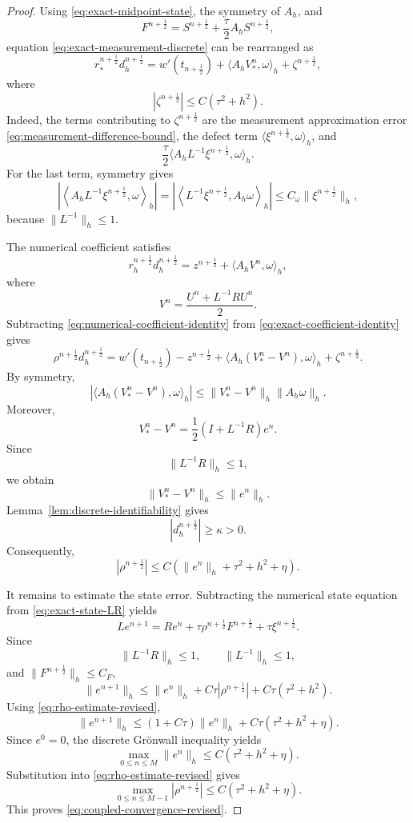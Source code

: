 \documentclass[10pt,a4paper]{amsart}
\begin{document}
\begin{proof}
Using \eqref{eq:exact-midpoint-state},
the symmetry of \(A_h\), and
\[
F^{n+\frac12}
=
S^{n+\frac12}
+
\frac{\tau}{2}A_hS^{n+\frac12},
\]
equation \eqref{eq:exact-measurement-discrete} can be rearranged as
\begin{equation}
r_*^{n+\frac12}
d_h^{n+\frac12}
=
w'(t_{n+\frac12})
+
\langle A_hV_*^n,\omega\rangle_h
+
\zeta^{n+\frac12},
\label{eq:exact-coefficient-identity}
\end{equation}
where
\begin{equation}
|\zeta^{n+\frac12}|
\le
C(\tau^2+h^2).
\label{eq:zeta-bound}
\end{equation}
Indeed, the terms contributing to \(\zeta^{n+\frac12}\) are
the measurement approximation error
\eqref{eq:measurement-difference-bound},
the defect term
\(\langle\xi^{n+\frac12},\omega\rangle_h\),
and
\[
\frac{\tau}{2}
\langle
A_hL^{-1}\xi^{n+\frac12},
\omega
\rangle_h.
\]
For the last term, symmetry gives
\[
\left|
\left\langle
A_hL^{-1}\xi^{n+\frac12},
\omega
\right\rangle_h
\right|
=
\left|
\left\langle
L^{-1}\xi^{n+\frac12},
A_h\omega
\right\rangle_h
\right|
\le
C_\omega
\|\xi^{n+\frac12}\|_h,
\]
because \(\|L^{-1}\|_h\le1\).

The numerical coefficient satisfies
\begin{equation}
r_h^{n+\frac12}
d_h^{n+\frac12}
=
z^{n+\frac12}
+
\langle A_hV^n,\omega\rangle_h,
\label{eq:numerical-coefficient-identity}
\end{equation}
where
\[
V^n
=
\frac{U^n+L^{-1}RU^n}{2}.
\]
Subtracting
\eqref{eq:numerical-coefficient-identity}
from \eqref{eq:exact-coefficient-identity} gives
\[
\rho^{n+\frac12}d_h^{n+\frac12}
=
w'(t_{n+\frac12})-z^{n+\frac12}
+
\langle A_h(V_*^n-V^n),\omega\rangle_h
+
\zeta^{n+\frac12}.
\]
By symmetry,
\[
\left|
\langle A_h(V_*^n-V^n),\omega\rangle_h
\right|
\le
\|V_*^n-V^n\|_h
\|A_h\omega\|_h.
\]
Moreover,
\[
V_*^n-V^n
=
\frac12
\left(
I+L^{-1}R
\right)e^n.
\]
Since
\[
\|L^{-1}R\|_h\le1,
\]
we obtain
\[
\|V_*^n-V^n\|_h
\le
\|e^n\|_h.
\]
Lemma~\ref{lem:discrete-identifiability} gives
\[
|d_h^{n+\frac12}|
\ge\kappa>0.
\]
Consequently,
\begin{equation}
|\rho^{n+\frac12}|
\le
C\left(
\|e^n\|_h
+
\tau^2+h^2+\eta
\right).
\label{eq:rho-estimate-revised}
\end{equation}

It remains to estimate the state error. Subtracting the numerical
state equation from \eqref{eq:exact-state-LR} yields
\[
Le^{n+1}
=
Re^n
+
\tau\rho^{n+\frac12}F^{n+\frac12}
+
\tau\xi^{n+\frac12}.
\]
Since
\[
\|L^{-1}R\|_h\le1,
\qquad
\|L^{-1}\|_h\le1,
\]
and \(\|F^{n+\frac12}\|_h\le C_F\),
\[
\|e^{n+1}\|_h
\le
\|e^n\|_h
+
C\tau|\rho^{n+\frac12}|
+
C\tau(\tau^2+h^2).
\]
Using \eqref{eq:rho-estimate-revised},
\[
\|e^{n+1}\|_h
\le
(1+C\tau)\|e^n\|_h
+
C\tau(\tau^2+h^2+\eta).
\]
Since \(e^0=0\), the discrete Gr\"onwall inequality yields
\[
\max_{0\le n\le M}\|e^n\|_h
\le
C(\tau^2+h^2+\eta).
\]
Substitution into \eqref{eq:rho-estimate-revised} gives
\[
\max_{0\le n\le M-1}
|\rho^{n+\frac12}|
\le
C(\tau^2+h^2+\eta).
\]
This proves \eqref{eq:coupled-convergence-revised}.
\end{proof}
\end{document}
